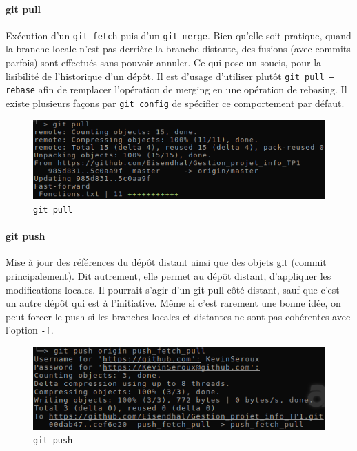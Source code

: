 \documentclass[11pt,canadien]{article}
\begin{document}
\paragraph{git pull}Exécution d'un \texttt{git fetch} puis d'un \texttt{git merge}. Bien qu'elle soit pratique, quand la branche locale n'est pas derrière la branche distante, des fusions (avec commits parfois) sont effectués sans pouvoir annuler. Ce qui pose un soucis, pour la lisibilité de l'historique d'un dépôt. Il est d'usage d'utiliser plutôt \texttt{git pull --rebase} afin de remplacer l'opération de merging en une opération de rebasing. Il existe plusieurs façons par \texttt{git config} de spécifier ce comportement par défaut.
\begin{figure}
	\centering
	\includegraphics{images/git_pull.png}
	\caption{\texttt{git pull}}
	\label{fig:git_pull}
\end{figure}

\paragraph{git push}Mise à jour des références du dépôt distant ainsi que des objets git (commit principalement). Dit autrement, elle permet au dépôt distant, d'appliquer les modifications locales. Il pourrait s'agir d'un git pull côté distant, sauf que c'est un autre dépôt qui est à l'initiative. Même si c'est rarement une bonne idée, on peut forcer le push si les branches locales et distantes ne sont pas cohérentes avec l'option \texttt{-f}.
\begin{figure}
	\centering
	\includegraphics{images/git_push.png}
	\caption{\texttt{git push}}
	\label{fig:git_push}
\end{figure}
\end{document}
